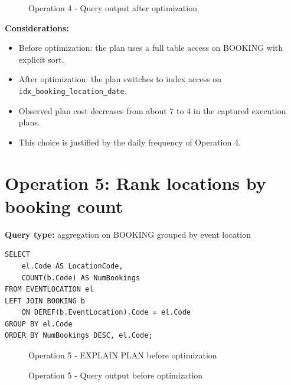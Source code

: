 \begin{figure}[H]
    \centering
    \begin{subfigure}[t]{0.49\textwidth}
        \centering
    \end{subfigure}
    \hfill
    \begin{subfigure}[t]{0.49\textwidth}
        \centering
    \end{subfigure}
    \caption{Operation 4 - Query output after optimization}
\end{figure}

\textbf{Considerations:}
\begin{itemize}
    \item Before optimization: the plan uses a full table access on BOOKING with explicit sort.
    \item After optimization: the plan switches to index access on \texttt{idx\_booking\_location\_date}.
    \item Observed plan cost decreases from about 7 to 4 in the captured execution plans.
    \item This choice is justified by the daily frequency of Operation 4.
\end{itemize}

\section{Operation 5: Rank locations by booking count}

\textbf{Query type:} aggregation on BOOKING grouped by event location

\begin{lstlisting}
SELECT
    el.Code AS LocationCode,
    COUNT(b.Code) AS NumBookings
FROM EVENTLOCATION el
LEFT JOIN BOOKING b
    ON DEREF(b.EventLocation).Code = el.Code
GROUP BY el.Code
ORDER BY NumBookings DESC, el.Code;
\end{lstlisting}

\begin{figure}[H]
    \centering
    \caption{Operation 5 - EXPLAIN PLAN before optimization}
\end{figure}

\begin{figure}[H]
    \centering
    \begin{subfigure}[t]{0.49\textwidth}
        \centering
    \end{subfigure}
    \hfill
    \begin{subfigure}[t]{0.49\textwidth}
        \centering
    \end{subfigure}
    \caption{Operation 5 - Query output before optimization}
\end{figure}

